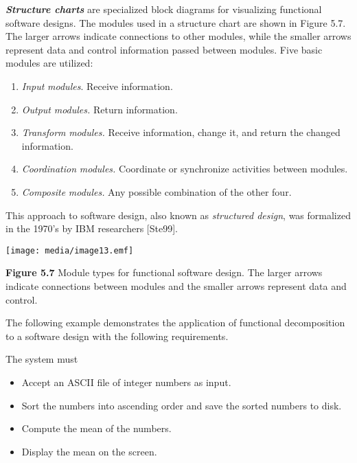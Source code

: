 \emph{\textbf{Structure charts}} are specialized block diagrams for
visualizing functional software designs. The modules used in a structure
chart are shown in Figure 5.7. The larger arrows indicate connections to
other modules, while the smaller arrows represent data and control
information passed between modules. Five basic modules are utilized:

\begin{enumerate}
\def\labelenumi{\arabic{enumi}.}
\item
  \emph{Input} \emph{modules}. Receive information.
\item
  \emph{Output} \emph{modules.} Return information.
\item
  \emph{Transform} \emph{modules.} Receive information, change it, and
  return the changed information.
\item
  \emph{Coordination} \emph{modules.} Coordinate or synchronize
  activities between modules.
\item
  \emph{Composite} \emph{modules.} Any possible combination of the other
  four.
\end{enumerate}

This approach to software design, also known as \emph{structured
design}, was formalized in the 1970's by IBM researchers {[}Ste99{]}.

\texttt{[image: media/image13.emf]}

\textbf{Figure 5.7} Module types for functional software design. The
larger arrows indicate connections between modules and the smaller
arrows represent data and control.

The following example demonstrates the application of functional
decomposition to a software design with the following requirements.

The system must

\begin{itemize}
\item
  Accept an ASCII file of integer numbers as input.
\item
  Sort the numbers into ascending order and save the sorted numbers to
  disk.
\item
  Compute the mean of the numbers.
\item
  Display the mean on the screen.
\end{itemize}

